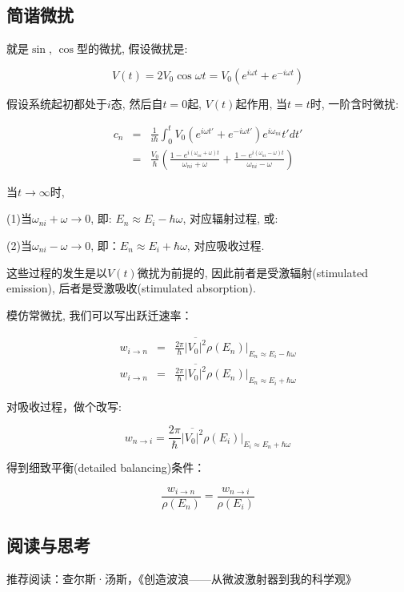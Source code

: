 \subsection{简谐微扰}

就是$\sin$, $\cos$型的微扰, 假设微扰是:

\begin{equation}\label{Harmonic Perturbation}
V(t)= 2 V_0 \cos \omega t = V_0 \left( e^{i \omega t} + e^{- i
\omega t} \right)
\end{equation}


假设系统起初都处于$i$态, 然后自$t=0$起, $V(t)$起作用, 当$t = t$时,
一阶含时微扰:

\begin{eqnarray*}
  c_n &=& \frac{1}{i \hbar} \int_0^t V_0 \left( e^{i \omega t'} + e^{-i \omega t'}  \right) e^{i \omega_{ni}} t' d t' \\
  {} &=& \frac{V_0}{\hbar} \left( \frac{1-e^{i(\omega_{ni} + \omega)t}}{\omega_{ni} + \omega }  + \frac{1-e^{i(\omega_{ni} - \omega)t}}{\omega_{ni} - \omega} \right)
\end{eqnarray*}

当$t \to \infty$时,

(1)当$\omega_{ni} + \omega \to 0$, 即: $E_n \approx E_i - \hbar
\omega $, 对应辐射过程, 或:

(2)当$\omega_{ni} - \omega \to 0$, 即：$E_n \approx E_i + \hbar
\omega$, 对应吸收过程.

这些过程的发生是以$V(t)$微扰为前提的, 因此前者是受激辐射(stimulated
emission), 后者是受激吸收(stimulated absorption).


模仿常微扰, 我们可以写出跃迁速率：


\begin{eqnarray*}
  w_{i \to n} &=& \frac{2\pi}{\hbar} \overline{|V_0|^2} \rho (E_n) |_{E_n \approx E_i - \hbar \omega} \\
  w_{i \to n} &=& \frac{2\pi}{\hbar} \overline{|V_0|^2} \rho (E_n) |_{E_n \approx E_i + \hbar \omega}
\end{eqnarray*}

对吸收过程，做个改写:

\begin{equation*}
    w_{n \to i} = \frac{2\pi}{\hbar} \overline{|V_0|^2} \rho (E_i) |_{E_i \approx E_n + \hbar \omega}
\end{equation*}


得到细致平衡(detailed balancing)条件：

\begin{equation}\label{detailed balancing}
 \frac{w_{i \to n}}{\rho (E_n) } = \frac{w_{n \to i}}{\rho (E_i)}
\end{equation}


\subsection*{阅读与思考}

推荐阅读：查尔斯·汤斯，《创造波浪——从微波激射器到我的科学观》